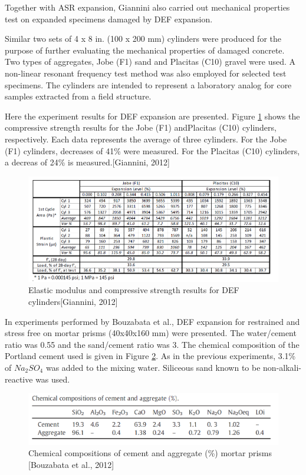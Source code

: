 \clearpage

Together with ASR expansion, Giannini also carried out mechanical properties test on expanded specimens damaged by DEF expansion.

Similar two sets of 4 x 8 in. (100 x 200 mm) cylinders were produced for the purpose of further evaluating the mechanical properties of damaged concrete. Two types of aggregates, Jobe (F1) sand and Placitas (C10) gravel were used. A non-linear resonant frequency test method was also employed for selected test specimens. The cylinders are intended to represent a laboratory analog for core samples extracted from a field structure.

Here the experiment results for DEF expansion are presented. Figure \ref{Giannini, 2012 DEF} shows the compressive strength results for the Jobe (F1) andPlacitas (C10) cylinders, respectively. Each data represents the average of three cylinders. For the Jobe (F1) cylinders, decreases of 41\% were measured. For the Placitas (C10) cylinders, a decreas of 24\% is measured.[Giannini, 2012]

\begin{figure}[h!]
  \centering
  \includegraphics[width=0.8\linewidth]{Reference/GIANNINIDEF.png}
  \caption{Elastic modulus and compressive strength results for DEF cylinders[Giannini, 2012]}
  \label{Giannini, 2012 DEF}
\end{figure}

\clearpage

In experiments performed by Bouzabata et al., DEF expansion for restrained and stress free on mortar prisms (40x40x160 mm) were presented. The water/cement ratio was 0.55 and the sand/cement ratio was 3. The chemical composition of the Portland cement used is given in Figure \ref{Bouzabata (2012)1}. As in the previous experiments, 3.1\% of $Na_2SO_4$ was added to the mixing water. Siliceous sand known to be non-alkali-reactive was used.

\begin{figure}[h!]
  \centering
  \includegraphics[width=0.8\linewidth]{Reference/Bouzabata1.png}
  \caption{Chemical compositions of cement and aggregate (\%) mortar prisms [Bouzabata et al., 2012]}
  \label{Bouzabata (2012)1}
\end{figure}

